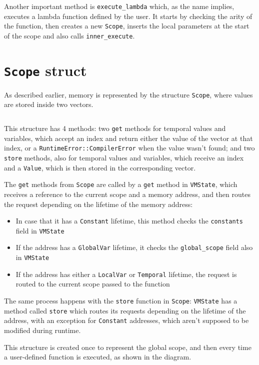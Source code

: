 \documentclass[11pt]{scrreprt}
\begin{document}
Another important method is \texttt{execute\_lambda} which, as the name implies, executes a lambda function defined by the user. It starts by checking the arity of the function, then creates a new \texttt{Scope}, inserts the local parameters at the start of the scope and also calls \texttt{inner\_execute}.

\section{\texttt{Scope} struct}
As described earlier, memory is represented by the structure \texttt{Scope}, where values are stored inside two vectors.

\inputminted[firstline=7,lastline=13]{rust}{/home/mario/git/MarioJim/miniclj/miniclj-lib/src/vm/scope.rs}

This structure has 4 methods: two \texttt{get} methods for temporal values and variables, which accept an index and return either the value of the vector at that index, or a \texttt{RuntimeError::CompilerError} when the value wasn't found; and two \texttt{store} methods, also for temporal values and variables, which receive an index and a \texttt{Value}, which is then stored in the corresponding vector.

The \texttt{get} methods from \texttt{Scope} are called by a \texttt{get} method in \texttt{VMState}, which receives a reference to the current scope and a memory address, and then routes the request depending on the lifetime of the memory address:
\begin{itemize}
  \item In case that it has a \texttt{Constant} lifetime, this method checks the \texttt{constants} field in \texttt{VMState}
  \item If the address has a \texttt{GlobalVar} lifetime, it checks the \texttt{global\_scope} field also in \texttt{VMState}
  \item If the address has either a \texttt{LocalVar} or \texttt{Temporal} lifetime, the request is routed to the current scope passed to the function
\end{itemize}

The same process happens with the \texttt{store} function in \texttt{Scope}: \texttt{VMState} has a method called \texttt{store} which routes its requests depending on the lifetime of the address, with an exception for \texttt{Constant} addresses, which aren't supposed to be modified during runtime.

This structure is created once to represent the global scope, and then every time a user-defined function is executed, as shown in the diagram.
\end{document}

